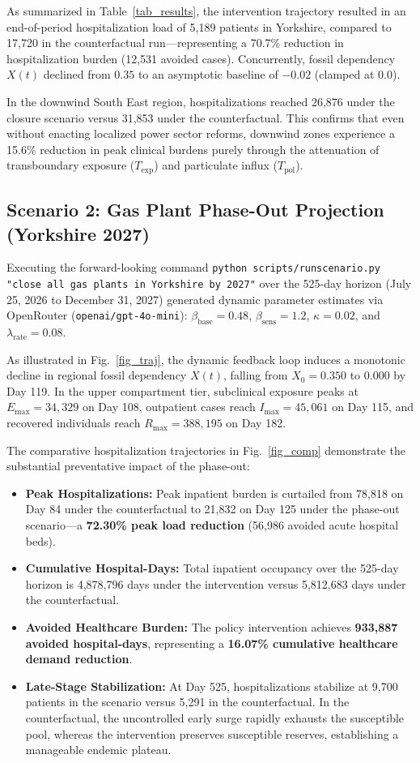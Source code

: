 \documentclass[conference]{IEEEtran}
\renewcommand{\_}{\textunderscore\allowbreak{}}%
\begin{document}
As summarized in Table~\ref{tab_results}, the intervention trajectory resulted in an end-of-period hospitalization load of 5,189 patients in Yorkshire, compared to 17,720 in the counterfactual run—representing a 70.7\% reduction in hospitalization burden (12,531 avoided cases). Concurrently, fossil dependency $X(t)$ declined from $0.35$ to an asymptotic baseline of $-0.02$ (clamped at $0.0$).

In the downwind South East region, hospitalizations reached 26,876 under the closure scenario versus 31,853 under the counterfactual. This confirms that even without enacting localized power sector reforms, downwind zones experience a 15.6\% reduction in peak clinical burdens purely through the attenuation of transboundary exposure ($T_{\text{exp}}$) and particulate influx ($T_{\text{pol}}$).

\subsection{Scenario 2: Gas Plant Phase-Out Projection (Yorkshire 2027)}
Executing the forward-looking command \texttt{python scripts/run\_scenario.py "close all gas plants in Yorkshire by 2027"} over the 525-day horizon (July 25, 2026 to December 31, 2027) generated dynamic parameter estimates via OpenRouter (\texttt{openai/gpt-4o-mini}): $\beta_{\text{base}} = 0.48$, $\beta_{\text{sens}} = 1.2$, $\kappa = 0.02$, and $\lambda_{\text{rate}} = 0.08$.

As illustrated in Fig.~\ref{fig_traj}, the dynamic feedback loop induces a monotonic decline in regional fossil dependency $X(t)$, falling from $X_0 = 0.350$ to $0.000$ by Day 119. In the upper compartment tier, subclinical exposure peaks at $E_{\text{max}} = 34,329$ on Day 108, outpatient cases reach $I_{\text{max}} = 45,061$ on Day 115, and recovered individuals reach $R_{\text{max}} = 388,195$ on Day 182.

The comparative hospitalization trajectories in Fig.~\ref{fig_comp} demonstrate the substantial preventative impact of the phase-out:
\begin{itemize}
    \item \textbf{Peak Hospitalizations:} Peak inpatient burden is curtailed from 78,818 on Day 84 under the counterfactual to 21,832 on Day 125 under the phase-out scenario—a \textbf{72.30\% peak load reduction} (56,986 avoided acute hospital beds).
    \item \textbf{Cumulative Hospital-Days:} Total inpatient occupancy over the 525-day horizon is 4,878,796 days under the intervention versus 5,812,683 days under the counterfactual.
    \item \textbf{Avoided Healthcare Burden:} The policy intervention achieves \textbf{933,887 avoided hospital-days}, representing a \textbf{16.07\% cumulative healthcare demand reduction}.
    \item \textbf{Late-Stage Stabilization:} At Day 525, hospitalizations stabilize at 9,700 patients in the scenario versus 5,291 in the counterfactual. In the counterfactual, the uncontrolled early surge rapidly exhausts the susceptible pool, whereas the intervention preserves susceptible reserves, establishing a manageable endemic plateau.
\end{itemize}
\end{document}
